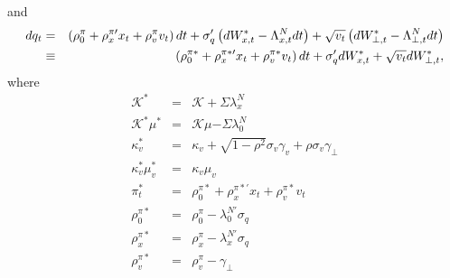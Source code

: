 \documentclass{article}
\begin{document}
and%
\begin{eqnarray*}
dq_{t} &=&\left( \rho _{0}^{\pi }+\rho _{x}^{\pi \prime }x_{t}+\rho
_{v}^{\pi }v_{t}\right) dt+\sigma _{q}^{\prime }\left( dW_{x,t}^{\ast
}-\Lambda _{x,t}^{N}dt\right) +\sqrt{v_{t}}\left( dW_{\bot ,t}^{\ast
}-\Lambda _{\bot ,t}^{N}dt\right)  \\
&\equiv &\left( \rho _{0}^{\pi \ast }+\rho _{x}^{\pi \ast \prime }x_{t}+\rho
_{v}^{\pi \ast }v_{t}\right) dt+\sigma _{q}^{\prime }dW_{x,t}^{\ast }+\sqrt{%
v_{t}}dW_{\bot ,t}^{\ast },
\end{eqnarray*}%
where 
\begin{eqnarray*}
\mathcal{K}^{\ast } &=&\mathcal{K+}\Sigma \lambda _{x}^{N} \\
\mathcal{K}^{\ast }\mu ^{\ast } &=&\mathcal{K}\mu \mathcal{-}\Sigma \lambda
_{0}^{N} \\
\kappa _{v}^{\ast } &=&\kappa _{v}+\sqrt{1-\rho ^{2}}\sigma _{v}\gamma
_{v}+\rho \sigma _{v}\gamma _{\bot } \\
\kappa _{v}^{\ast }\mu _{v}^{\ast } &=&\kappa _{v}\mu _{v} \\
\pi _{t}^{\ast } &=&\rho _{0}^{\pi \ast }+\rho _{x}^{\pi \ast \prime
}x_{t}+\rho _{v}^{\pi \ast }v_{t} \\
\rho _{0}^{\pi \ast } &=&\rho _{0}^{\pi }-\lambda _{0}^{N\prime }\sigma _{q}
\\
\rho _{x}^{\pi \ast } &=&\rho _{x}^{\pi }-\lambda _{x}^{N\prime }\sigma _{q}
\\
\rho _{v}^{\pi \ast } &=&\rho _{v}^{\pi }-\gamma _{\bot }
\end{eqnarray*}
\end{document}
